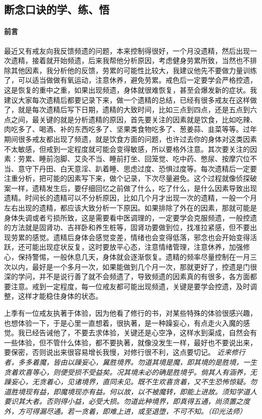 \subsection{断念口诀的学、练、悟}

\paragraph{前言}

最近又有戒友向我反馈频遗的问题，本来控制得很好，一个月没遗精，然后出现一次遗精，接着就开始频遗，后来我帮他分析原因，考虑健身劳累所致，当然也不排除其他因素，我分析他的反馈，劳累的可能性比较大，我建议他先不要做力量训练了，可以适当做做有氧运动，注意休养，避免劳累。戒色后一定要学会严格控遗，这是恢复的重中之重，如果出现频遗，身体就很难恢复，甚至会爆发新的症状。我建议大家每次遗精后都要记录下来，做一个遗精的总结，已经有很多戒友在这样做了，就是每次遗精后写下日期，遗精的大致时间，比如三点到四点，还是五点到六点之间，最关键的就是分析遗精的原因，首先要关注的因素就是饮食，比如吃辣、肉吃多了、喝酒、补的东西吃多了、坚果类食物吃多了、葱姜蒜、韭菜等等。过年期间很多戒友都出现了频遗，就是饮食方面的问题，也许过去你的身体对这类因素不太敏感，但戒到一定程度就可能会变得敏感，所以要格外注意。其次要关注的因素：劳累、睡前泡脚、艾灸不当、睡前打坐、回笼觉、吃中药、憋尿、按摩穴位不当、意守下丹田、白天意淫、趴着睡、思虑过度、恐惧过度等。每次遗精后一定要注重分析，把可能的因素写下来，做个记录，下次尽量避免。这个过程就像侦探破案一样，遗精发生后，要仔细回忆之前做了什么，吃了什么，是什么因素导致出现遗精。时间长的遗精可以不分析原因，比如几个月才出现一次的遗精，一般一个月左右出现的遗精，都应该大致分析一下原因。如果排除了外在的因素，那就可能是身体失调或者亏损所致，这是需要看中医调理的，一定要学会克服频遗，一般控遗的方法就是固肾功、吉祥卧和养生桩等，固肾功要做到位，找准拉紧感，但不要出现劳累的感觉。遗精后身体会感觉变差，情绪也会变得低落，邪念也会开始变得活跃，还可能出现症状反复，这时要放平心态，注意情绪管理，注意休养，加强修心，保持警惕，一般休息几天，身体就会逐渐恢复。遗精的频率尽量控制在一月三次以内，最好是一个多月一次，如果能做到几个月一次，那就更好了，控遗是门很深的学问，并不是说行善了就不会频遗了，导致频遗的因素真的有很多，各方面都要注意。戒到一定程度，每一位戒友都可能出现频遗，关键是要学会控遗，及时调整，这样才能稳住身体的状态。

上季有一位戒友执著于体验，因为他看了修行的书，对某些特殊的体验很感兴趣，也想体验一下，于是心里一直想着，很执著，是一种躁妄心，有点走火入魔的感觉。我已经告诫他了，不要去求体验，关键还是心空净，这样水到渠成，自然会有一些体验，但不管什么体验，都不要执著，就像没发生一样，最好也不要说出来，要保密，否则说出来很容易增长我慢，对修行很不利，这点要切记。 \textit{近来修行者，多多着魔，皆由以躁妄心，冀胜境界。勿道其境是魔，即其境的是胜境，一生贪着欢喜等心，则便受损不受益矣。况其境未必的确是胜境乎。倘其人有涵养，无躁妄心，无贪着心，见诸境界，直同未见。既不生欢喜贪着，又不生恐怖惊疑。勿道胜境现有益，即魔境现亦有益。何以故，以不被魔转，即能上进故。须知学道人要识其大者。否则得小益，必受大损。勿道此种境界，即真得五通，尚须置之度外，方可得漏尽通。若一贪着，即难上进，或至退堕，不可不知。（印光法师）}

